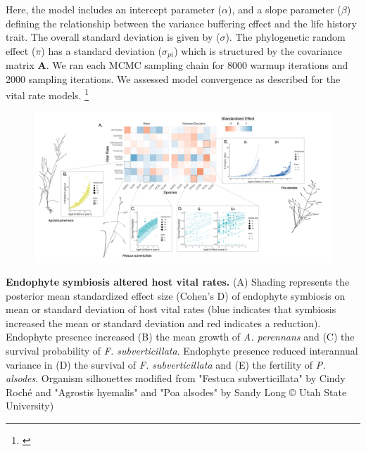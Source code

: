 \documentclass[12pt]{article}
\newcommand{\tom}[2]{{\color{red}{#1}}\footnote{\textit{\color{red}{#2}}}}
\begin{document}
Here, the model includes an intercept parameter ($\alpha$), and a slope parameter ($\beta$) defining the relationship between the variance buffering effect and the life history trait. 
The overall standard deviation is given by ($\sigma$). 
The phylogenetic random effect ($\pi$) has a standard deviation ($\sigma_{pi}$) which is structured by the covariance matrix \textbf{A}.
We ran each MCMC sampling chain for 8000 warmup iterations and 2000 sampling iterations. 
We assessed model convergence as described for the vital rate models.
\tom{}{What is i? Is that species?} 








\clearpage


\begin{figure}
	\centering
	\includegraphics[width=\linewidth]{StochDemo_fig1.png}
\end{figure}
 \textbf{Endophyte symbiosis altered host vital rates.} (A) Shading represents the posterior mean standardized effect size (Cohen's D) of endophyte symbiosis on mean or standard deviation of host vital rates (blue indicates that symbiosis increased the mean or standard deviation and red indicates a reduction). Endophyte presence increased (B) the mean growth of \emph{A. perennans} and (C) the survival probability of \emph{F. subverticillata}. Endophyte presence reduced interannual variance in (D) the survival of \emph{F. subverticillata} and (E) the fertility of \emph{P. alsodes}. Organism silhouettes modified from "Festuca subverticillata" by Cindy Roché and "Agrostis hyemalis" and "Poa alsodes" by Sandy Long © Utah State University)
\newpage
\end{document}
